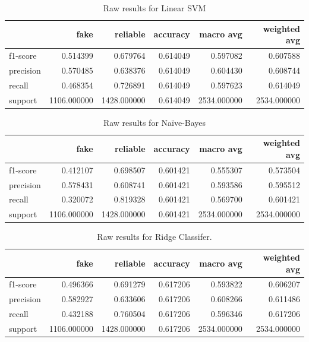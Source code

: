 \begin{table}
\begin{tabular}{lrrrrr}
\toprule
{} &         fake &     reliable &  accuracy &    macro avg &  weighted avg \\
\midrule
f1-score  &     0.514399 &     0.679764 &  0.614049 &     0.597082 &      0.607588 \\
precision &     0.570485 &     0.638376 &  0.614049 &     0.604430 &      0.608744 \\
recall    &     0.468354 &     0.726891 &  0.614049 &     0.597623 &      0.614049 \\
support   &  1106.000000 &  1428.000000 &  0.614049 &  2534.000000 &   2534.000000 \\
\bottomrule
\end{tabular}
\caption{Raw results for Linear SVM}
\end{table}

\begin{table}
\begin{tabular}{lrrrrr}
\toprule
{} &         fake &     reliable &  accuracy &    macro avg &  weighted avg \\
\midrule
f1-score  &     0.412107 &     0.698507 &  0.601421 &     0.555307 &      0.573504 \\
precision &     0.578431 &     0.608741 &  0.601421 &     0.593586 &      0.595512 \\
recall    &     0.320072 &     0.819328 &  0.601421 &     0.569700 &      0.601421 \\
support   &  1106.000000 &  1428.000000 &  0.601421 &  2534.000000 &   2534.000000 \\
\bottomrule
\end{tabular}
\caption{Raw results for Naïve-Bayes}
\end{table}

\begin{table}
\begin{tabular}{lrrrrr}
\toprule
{} &         fake &     reliable &  accuracy &    macro avg &  weighted avg \\
\midrule
f1-score  &     0.496366 &     0.691279 &  0.617206 &     0.593822 &      0.606207 \\
precision &     0.582927 &     0.633606 &  0.617206 &     0.608266 &      0.611486 \\
recall    &     0.432188 &     0.760504 &  0.617206 &     0.596346 &      0.617206 \\
support   &  1106.000000 &  1428.000000 &  0.617206 &  2534.000000 &   2534.000000 \\
\bottomrule
\end{tabular}
\caption{Raw results for Ridge Classifer.}
\end{table}

